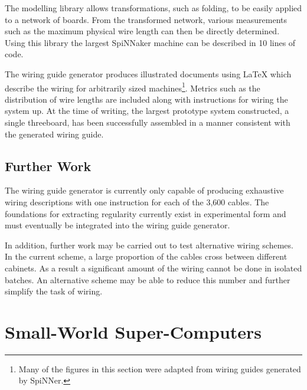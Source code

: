 			The modelling library allows transformations, such as folding, to be
			easily applied to a network of boards. From the transformed network,
			various measurements such as the maximum physical wire length can then be
			directly determined. Using this library the largest SpiNNaker machine can
			be described in 10 lines of code.
			
			The wiring guide generator produces illustrated documents using \LaTeX{}
			which describe the wiring for arbitrarily sized machines\footnote{Many of
			the figures in this section were adapted from wiring guides generated by
			SpiNNer.}. Metrics such as the distribution of wire lengths are included
			along with instructions for wiring the system up. At the time of writing,
			the largest prototype system constructed, a single threeboard, has been
			successfully assembled in a manner consistent with the generated wiring
			guide.
		
		\subsection{Further Work}
			
			
			The wiring guide generator is currently only capable of producing
			exhaustive wiring descriptions with one instruction for each of the 3,600
			cables. The foundations for extracting regularity currently exist in
			experimental form and must eventually be integrated into the wiring guide
			generator.
			
			In addition, further work may be carried out to test alternative wiring
			schemes. In the current scheme, a large proportion of the cables cross
			between different cabinets. As a result a significant amount of the wiring
			cannot be done in isolated batches. An alternative scheme may be able to
			reduce this number and further simplify the task of wiring.
	
	\section{Small-World Super-Computers}
		
		\label{sec:small-world-super-computers}
		
		
